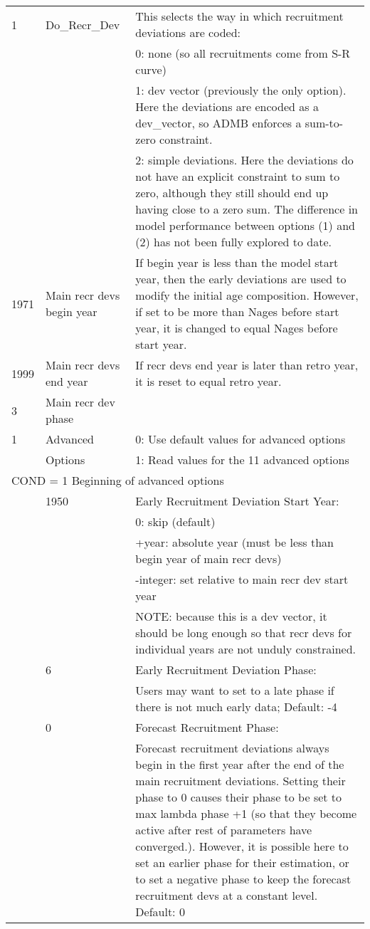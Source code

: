 \begin{center}
\begin{longtable}{p{1cm} p{3cm} p{11cm}}
		\hline
		1 & Do\_Recr\_Dev & This selects the way in which recruitment deviations are coded:\\
		  &  & 0:  none (so all recruitments come from S-R curve)\\
		  &  & 1:  dev vector (previously the only option).  Here the deviations are encoded as a dev\_vector, so ADMB enforces a sum-to-zero constraint.\\
		  &  & 2:  simple deviations.  Here the deviations do not have an explicit constraint to sum to zero, although they still should end up having close to a zero sum.  The difference in model performance between options (1) and (2) has not been fully explored to date.\\
		\hline
		1971 & Main recr devs begin year & If begin year is less than the model start year, then the early deviations are used to modify the initial age composition.   However, if set to be more than Nages before start year, it is changed to equal Nages before start year. \\
		\hline
		1999 & Main recr devs end year & If recr devs end year is later than retro year, it is reset to equal retro year. \\
		\hline
		3    & Main recr dev phase & \\
		\hline
		1 & Advanced  & 0: Use default values for advanced options \\
		  & Options  & 1: Read values for the 11 advanced options \\
		\hline
		\multicolumn{3}{l}{COND = 1 Beginning of advanced options}\\
		& 1950 & Early Recruitment Deviation Start Year: \\
		&  & 0: skip (default) \\
		&  & +year:  absolute year (must be less than begin year of main  recr devs)\\
		&  & -integer:  set relative to main recr dev start year\\
		&  & NOTE:  because this is a dev vector, it should be long enough so that recr devs for individual years are not unduly constrained. \\
		& 6 & Early Recruitment Deviation Phase: \\
		& & Users may want to set to a late phase if there is not much early data; Default:  -4\\
		& 0 & Forecast Recruitment Phase: \\
		& & Forecast recruitment deviations always begin in the first year after the end of the main recruitment deviations.  Setting their phase to 0 causes their phase to be set to max lambda phase +1 (so that they become active after rest of parameters have converged.).  However, it is possible here to set an earlier phase for their estimation, or to set a negative phase to keep the forecast recruitment devs at a constant level. Default:  0 \\

\end{longtable}
\end{center}
